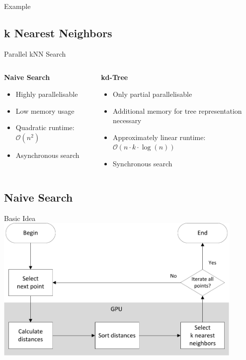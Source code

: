 \documentclass{beamer}
\begin{document}
\begin{frame}{Example}
\end{frame}

\subsection*{k Nearest Neighbors}

\begin{frame}{Parallel kNN Search}
	\begin{columns}[T]
		\begin{column}{0.5\textwidth}
			\textbf{Naive Search}
			\begin{itemize}
				\item Highly parallelisable
				\item Low memory usage
				\item Quadratic runtime: $\mathcal{O}(n^2)$
				\item Asynchronous search
			\end{itemize}
		\end{column}
		\begin{column}{0.5\textwidth}
			\textbf{kd-Tree}
			\begin{itemize}
				\item Only partial parallelisable
				\item Additional memory for tree representation necessary
				\item Approximately linear runtime: \mbox{$\mathcal{O}(n \cdot k \cdot \log(n))$}
				\item Synchronous search
			\end{itemize}
		\end{column}
	\end{columns}
\end{frame}

\subsection*{Naive Search}

\begin{frame}{Basic Idea}
	\centering
	\includegraphics[width=0.9\textwidth]{knn_procedure.pdf}
\end{frame}
\end{document}
